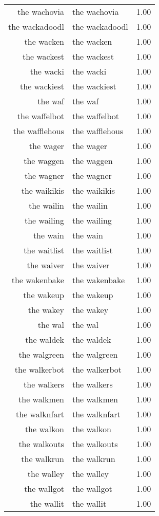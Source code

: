 \begin{table}[ht]
\begin{tabular}{rlr}
  the wachovia & the wachovia & 1.00 \\ 
  the wackadoodl & the wackadoodl & 1.00 \\ 
  the wacken & the wacken & 1.00 \\ 
  the wackest & the wackest & 1.00 \\ 
  the wacki & the wacki & 1.00 \\ 
  the wackiest & the wackiest & 1.00 \\ 
  the waf & the waf & 1.00 \\ 
  the waffelbot & the waffelbot & 1.00 \\ 
  the wafflehous & the wafflehous & 1.00 \\ 
  the wager & the wager & 1.00 \\ 
  the waggen & the waggen & 1.00 \\ 
  the wagner & the wagner & 1.00 \\ 
  the waikikis & the waikikis & 1.00 \\ 
  the wailin & the wailin & 1.00 \\ 
  the wailing & the wailing & 1.00 \\ 
  the wain & the wain & 1.00 \\ 
  the waitlist & the waitlist & 1.00 \\ 
  the waiver & the waiver & 1.00 \\ 
  the wakenbake & the wakenbake & 1.00 \\ 
  the wakeup & the wakeup & 1.00 \\ 
  the wakey & the wakey & 1.00 \\ 
  the wal & the wal & 1.00 \\ 
  the waldek & the waldek & 1.00 \\ 
  the walgreen & the walgreen & 1.00 \\ 
  the walkerbot & the walkerbot & 1.00 \\ 
  the walkers & the walkers & 1.00 \\ 
  the walkmen & the walkmen & 1.00 \\ 
  the walknfart & the walknfart & 1.00 \\ 
  the walkon & the walkon & 1.00 \\ 
  the walkouts & the walkouts & 1.00 \\ 
  the walkrun & the walkrun & 1.00 \\ 
  the walley & the walley & 1.00 \\ 
  the wallgot & the wallgot & 1.00 \\ 
  the wallit & the wallit & 1.00 \\ 

\end{tabular}
\end{table}
